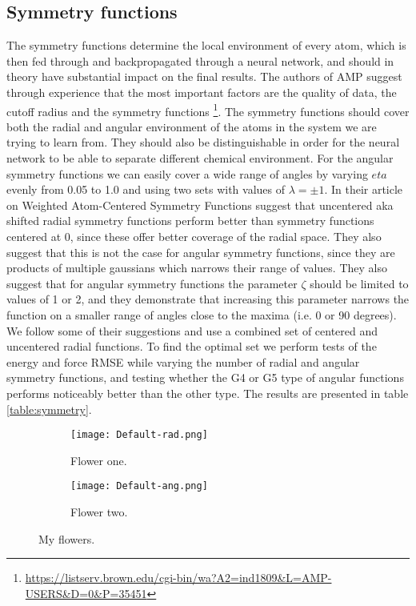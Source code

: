 \subsection{Symmetry functions}
The symmetry functions determine the local environment of every atom,
which is then fed through and backpropagated through a neural network,
and should in theory have substantial impact on the final results.
The authors of AMP suggest through experience that the most important
factors are the quality of data, the cutoff radius and the symmetry functions
\footnote{\url{
https://listserv.brown.edu/cgi-bin/wa?A2=ind1809&L=AMP-USERS&D=0&P=35451}}.
The symmetry functions should cover both the radial and angular
environment of the atoms in the system we are trying to learn from.
They should also be distinguishable in order for the neural network
to be able to separate different chemical environment.
For the angular symmetry functions we can easily cover a wide range
of angles by varying $eta$ evenly from 0.05 to 1.0 and using two sets
with values of $\lambda = \pm 1$.
In their article on Weighted Atom-Centered Symmetry Functions
\parencite[Gastegger et al.]{gastegger2018wacsf} suggest that uncentered
aka shifted radial symmetry functions perform better than symmetry functions
centered at 0, since these offer better coverage of the radial space.
They also suggest that this is not the case for angular symmetry functions,
since they are products of multiple gaussians which narrows their range
of values. They also suggest that for angular symmetry functions
the parameter $\zeta$ should be limited to values of 1 or 2,
and they demonstrate that increasing this parameter narrows
the function on a smaller range of angles close to the maxima
(i.e. 0 or 90 degrees).
We follow some of their suggestions and use a combined set of
centered and uncentered radial functions. To find the optimal set
we perform tests of the energy and force RMSE while varying the
number of radial and angular symmetry functions, and testing
whether the G4 or G5 type of angular functions performs noticeably
better than the other type.
The results are presented in table \ref{table:symmetry}.

\begin{figure}[!tbp]
\begin{adjustbox}{max width=1.2\linewidth,center}
\centering
  \begin{subfigure}[b]{0.55\textwidth}
      \texttt{[image: Default-rad.png]}
    \caption{Flower one.}
    \label{fig:f1}
  \end{subfigure}
  \hfill
  \begin{subfigure}[b]{0.55\textwidth}
      \texttt{[image: Default-ang.png]}
    \caption{Flower two.}
    \label{fig:f2}
  \end{subfigure}
\end{adjustbox}
\caption{My flowers.}
\end{figure}

